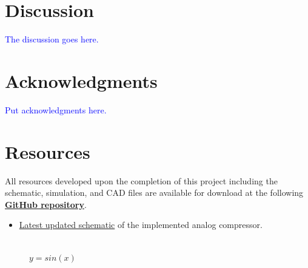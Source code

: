 \documentclass[10pt]{article}
\begin{document}
\begin{multicols*}{2}
        \section{Discussion}
            \textcolor{blue}{The discussion goes here.}

        \section*{Acknowledgments}
            \textcolor{blue}{Put acknowledgments here. }

        \section*{Resources}
            All resources developed upon the completion of this project including the schematic, simulation, and CAD files are available for download at the following \textbf{\textcolor{github-butterfly-bush}{\href{https://github.com/ShaunG-RU/DRC-Project}{GitHub repository}}}.
            
            \begin{itemize}
                \item \href{https://github.com/ShaunG-RU/DRC-Project/blob/main/Altium/DRC.pdf}{Latest updated schematic} of the implemented analog compressor.
            \end{itemize}

        \printbibliography

        \iffalse
        \begin{figure}[!th]

            \centering

            \begin{minipage}[b]{0.2\linewidth}
                \centering
                \\
                \footnotesize{$y=sin(x)$}
            \end{minipage}\hfill


\end{figure}
\end{multicols*}
\end{document}
